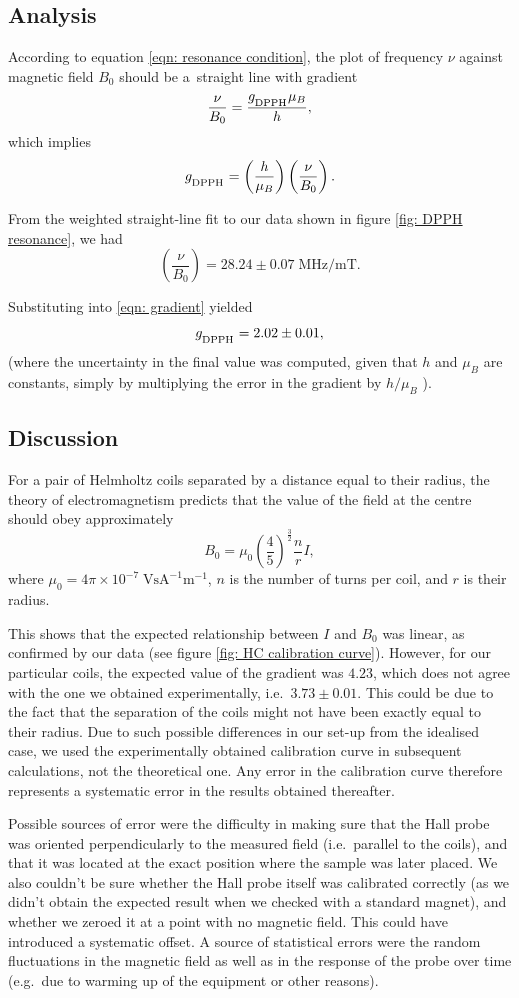 \documentclass[a4paper]{jpconf}
\numberwithin{equation}{section}
\begin{document}
\subsection{Analysis}
According to equation \eqref{eqn: resonance condition}, the plot of frequency $\nu$ against magnetic field $B_0$ should be a~straight line with gradient 
\[
	\frac{\nu}{B_0} = \frac{g_{\textsubscript{DPPH}} \mu_B}{h},
\]
which implies
\begin{equation} \label{eqn: gradient}
	g_{\textsubscript{DPPH}} = \left(\frac{h}{\mu_B}\right) \left(\frac{\nu}{B_0}\right). 
\end{equation}
	
From the weighted straight-line fit to our data shown in figure \ref{fig: DPPH resonance}, we had
\[
	\left(\frac{\nu}{B_0}\right) = 28.24 \pm 0.07 \; \si{\mega\hertz\per\milli\tesla}.
\]

Substituting into \eqref{eqn: gradient} yielded
\[
	g_{\textsubscript{DPPH}} = 2.02 \pm 0.01,
\] 
(where the uncertainty in the final value was computed, given that $h$ and $\mu_B$ are constants, simply by multiplying the error in the gradient by $h / \mu_B$ ).

\subsection{Discussion}
For a pair of Helmholtz coils separated by a distance equal to their radius, the theory of electromagnetism predicts that the value of the field at the centre should obey approximately
\[
	B_0 = \mu_0 \left(\frac45\right)^{\tfrac32} \frac{n}{r} I,
\]
where $\mu_0 = 4\pi\times10^{-7} \; \si{\volt\s\ampere\tothe{-1}\meter\tothe{-1}}$, $n$ is the number of turns per coil, and $r$ is their radius.

This shows that the expected relationship between $I$ and $B_0$ was linear, as confirmed by our data (see figure \ref{fig: HC calibration curve}).
However, for our particular coils, the expected value of the gradient was $4.23$, which does not agree with the one we obtained experimentally, i.e.\ $3.73 \pm 0.01$. This could be due to the fact that the separation of the coils might not have been exactly equal to their radius. Due to such possible differences in our set-up from the idealised case, we used the experimentally obtained calibration curve in subsequent calculations, not the theoretical one. Any error in the calibration curve therefore represents a systematic error in the results obtained thereafter.

Possible sources of error were the difficulty in making sure that the Hall probe was oriented perpendicularly to the measured field (i.e.\ parallel to the coils), and that it was located at the exact position where the sample was later placed. We also couldn't be sure whether the Hall probe itself was calibrated correctly (as we didn't obtain the expected result when we checked with a standard magnet), and whether we zeroed it at a point with no magnetic field. This could have introduced a systematic offset. A source of statistical errors were the random fluctuations in the magnetic field as well as in the response of the probe over time (e.g.\ due to warming up of the equipment or other reasons).
\end{document}

